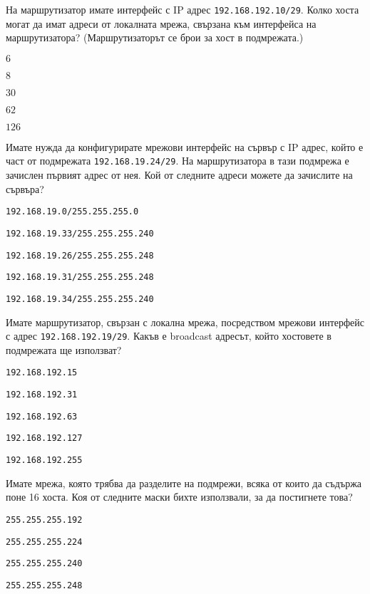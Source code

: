 \begin{q}
  На маршрутизатор имате интерфейс с IP адрес \texttt{192.168.192.10/29}. Колко
  хоста могат да имат адреси от локалната мрежа, свързана към интерфейса на
  маршрутизатора? (Маршрутизаторът се брои за хост в подмрежата.)
  \begin{defractors}
  \item $6$
  \item $8$
  \item $30$
  \item $62$
  \item $126$
  \end{defractors}
\end{q}

\begin{q}
  Имате нужда да конфигурирате мрежови интерфейс на сървър с IP адрес, който е
  част от подмрежата \texttt{192.168.19.24/29}. На маршрутизатора в тази
  подмрежа е зачислен първият адрес от нея. Кой от следните адреси можете да
  зачислите на сървъра?
  \begin{defractors}
  \item \texttt{192.168.19.0/255.255.255.0}
  \item \texttt{192.168.19.33/255.255.255.240}
  \item \texttt{192.168.19.26/255.255.255.248}
  \item \texttt{192.168.19.31/255.255.255.248}
  \item \texttt{192.168.19.34/255.255.255.240}
  \end{defractors}
\end{q}

\begin{q}
  Имате маршрутизатор, свързан с локална мрежа, посредством мрежови интерфейс с
  адрес \texttt{192.168.192.19/29}. Какъв е broadcast адресът, който хостовете в
  подмрежата ще използват?
  \begin{defractors}
  \item \texttt{192.168.192.15}
  \item \texttt{192.168.192.31}
  \item \texttt{192.168.192.63}
  \item \texttt{192.168.192.127}
  \item \texttt{192.168.192.255}
  \end{defractors}
\end{q}

\begin{q}
  Имате мрежа, която трябва да разделите на подмрежи, всяка от които да съдържа
  поне 16 хоста. Коя от следните маски бихте използвали, за да постигнете това?
  \begin{defractors}
  \item \texttt{255.255.255.192}
  \item \texttt{255.255.255.224}
  \item \texttt{255.255.255.240}
  \item \texttt{255.255.255.248}
  \end{defractors}
\end{q}

